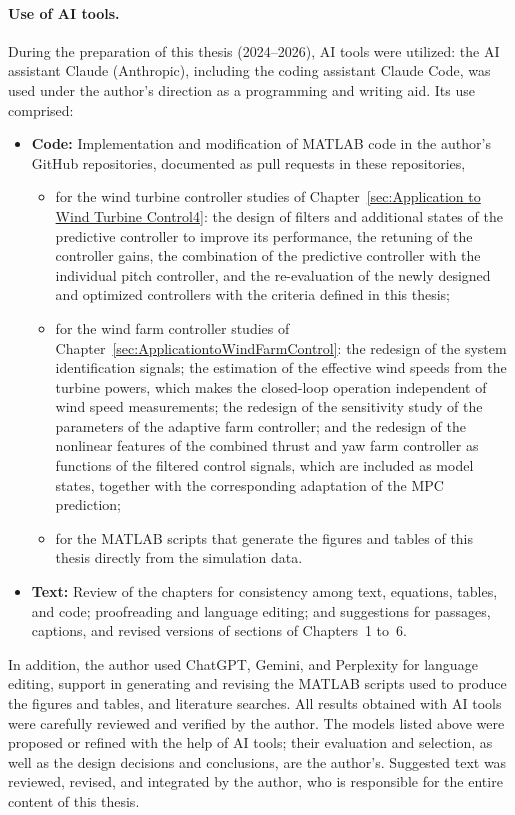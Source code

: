\paragraph{Use of AI tools.}
During the preparation of this thesis (2024--2026), AI tools were utilized: the AI assistant Claude (Anthropic), including the coding assistant Claude Code, was used under the author's direction as a programming and writing aid. Its use comprised:
\begin{itemize}
    \item \textbf{Code:} Implementation and modification of MATLAB code in the author's GitHub repositories, documented as pull requests in these repositories,
    \begin{itemize}
        \item for the wind turbine controller studies of Chapter~\ref{sec:Application to Wind Turbine Control4}: the design of filters and additional states of the predictive controller to improve its performance, the retuning of the controller gains, the combination of the predictive controller with the individual pitch controller, and the re-evaluation of the newly designed and optimized controllers with the criteria defined in this thesis;
        \item for the wind farm controller studies of Chapter~\ref{sec:ApplicationtoWindFarmControl}: the redesign of the system identification signals; the estimation of the effective wind speeds from the turbine powers, which makes the closed-loop operation independent of wind speed measurements; the redesign of the sensitivity study of the parameters of the adaptive farm controller; and the redesign of the nonlinear features of the combined thrust and yaw farm controller as functions of the filtered control signals, which are included as model states, together with the corresponding adaptation of the MPC prediction;
        \item for the MATLAB scripts that generate the figures and tables of this thesis directly from the simulation data.
    \end{itemize}
    \item \textbf{Text:} Review of the chapters for consistency among text, equations, tables, and code; proofreading and language editing; and suggestions for passages, captions, and revised versions of sections of Chapters~1 to~6.
\end{itemize}
In addition, the author used ChatGPT, Gemini, and Perplexity for language editing, support in generating and revising the MATLAB scripts used to produce the figures and tables, and literature searches. All results obtained with AI tools were carefully reviewed and verified by the author. The models listed above were proposed or refined with the help of AI tools; their evaluation and selection, as well as the design decisions and conclusions, are the author's. Suggested text was reviewed, revised, and integrated by the author, who is responsible for the entire content of this thesis.
